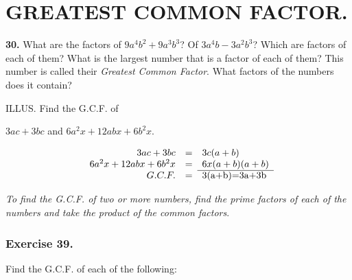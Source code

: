 \documentclass{book}
\begin{document}
\section*{GREATEST COMMON FACTOR.}


\textbf{30.} What are the factors of $9a^4b^2+9a^3b^3$?  Of $3a^4b-3a^2b^3$?
Which are factors of each of them? What is the largest
number that is a factor of each of them? This number
is called their \textit{Greatest Common Factor}. What factors of
the numbers does it contain?

ILLUS. Find the G.C.F. of

\begin{center}

$3ac+3bc$ and $6a^2x+12abx+6b^2x$.

\[
\begin{array}{rcll}
3ac+3bc & = & 3c(a+b) \\
6a^2x+12abx+6b^2x & = & 6x(a+b)(a+b) \\
\cline{3-3}
G.C.F. & = & \multicolumn{2}{l}{$3(a+b)=3a+3b$}
\end{array}
\]

\end{center}


\textit{To find the G.C.F. of two or more numbers, find the prime
factors of each of the numbers and take the product of the common
factors}.

\subsubsection*{Exercise 39.}

Find the G.C.F. of each of the following:
\end{document}

